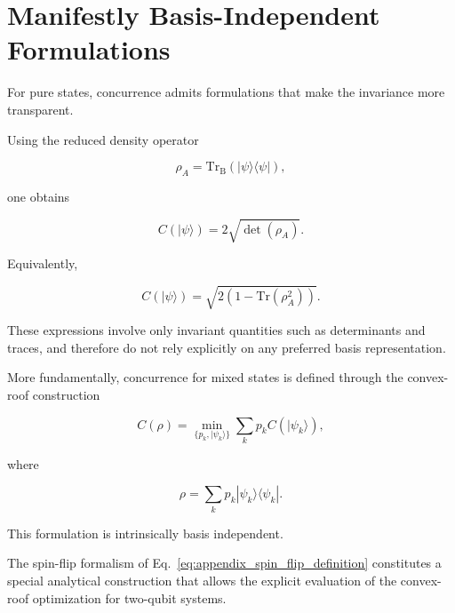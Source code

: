 \section*{Manifestly Basis-Independent Formulations}

For pure states, concurrence admits formulations that make the invariance more transparent.

Using the reduced density operator

\[
\rho_A
=
\mathrm{Tr_B}
\left(
|\psi\rangle\langle\psi|
\right),
\]

one obtains

\begin{equation}
C(|\psi\rangle)
=
2\sqrt{\det(\rho_A)}.
\label{eq:concurrence_determinant_appendix}
\end{equation}

Equivalently,

\begin{equation}
C(|\psi\rangle)
=
\sqrt{
2
\left(
1-\mathrm{Tr}(\rho_A^2)
\right)
}.
\label{eq:concurrence_purity_appendix}
\end{equation}

These expressions involve only invariant quantities such as determinants and traces, and therefore do not rely explicitly on any preferred basis representation.

\medskip

More fundamentally, concurrence for mixed states is defined through the convex-roof construction

\begin{equation}
C(\rho)
=
\min_{\{p_k,|\psi_k\rangle\}}
\sum_k
p_k
C(|\psi_k\rangle),
\label{eq:convex_roof_concurrence_appendix}
\end{equation}

where

\begin{equation}
\rho
=
\sum_k
p_k
|\psi_k\rangle\langle\psi_k|.
\label{eq:convex_decomposition_appendix}
\end{equation}

This formulation is intrinsically basis independent.

The spin-flip formalism of Eq.~\eqref{eq:appendix_spin_flip_definition} constitutes a special analytical construction that allows the explicit evaluation of the convex-roof optimization for two-qubit systems.


